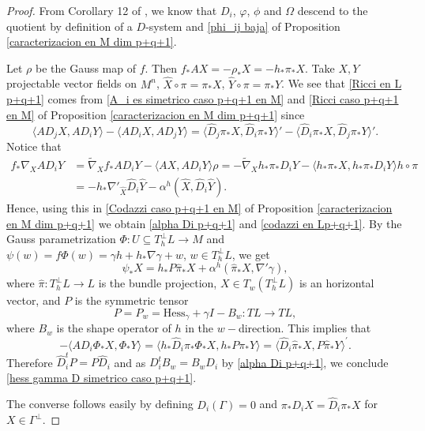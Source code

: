 \documentclass{article}
\theoremstyle{remark}
\begin{document}
\begin{proof}
    From Corollary 12 of \cite{DFT}, we know that $D_i$, $\varphi$, $\phi$ and $\Omega$ descend to the quotient by definition of a $D$-system and \ref{phi_ij baja} of Proposition \ref{caracterizacion en M dim p+q+1}. 
    
    Let $\rho$ be the Gauss map of $f$. Then $f_{*}AX=-\rho_{*}X=-h_{*}\pi_{*}X$. Take $X,Y$ projectable vector fields on $M^n$, $\hat{X}\circ\pi=\pi_{*}X$, $\hat{Y}\circ\pi=\pi_{*}Y$. We see that \ref{Ricci en L p+q+1} comes from \ref{A_i es simetrico caso p+q+1 en M} and \ref{Ricci caso p+q+1 en M} of Proposition \ref{caracterizacion en M dim p+q+1} since
    $$\langle AD_jX, AD_iY\rangle-\langle AD_iX,AD_jY\rangle=\langle \hat{D}_j\pi_{*}X,\hat{D}_i\pi_{*}Y\rangle'-\langle\hat{D}_i\pi_{*}X,\hat{D}_j\pi_{*}Y\rangle'.$$
    Notice that
    \begin{align*}
        f_{*}\nabla_X AD_iY&=\widetilde{\nabla}_X f_{*}AD_iY -\langle AX,AD_iY\rangle \rho=-\widetilde{\nabla}_X h_{*}\pi_{*}D_i Y-\langle h_{*}\pi_{*}X,h_{*}\pi_{*} D_iY\rangle h\circ\pi\\
        &=-h_{*}\nabla'_{\hat{X}}\hat{D}_i\hat{Y}-\alpha^h(\hat{X},\hat{D}_i\hat{Y}).
    \end{align*}
    Hence, using this in \ref{Codazzi caso p+q+1 en M} of Proposition \ref{caracterizacion en M dim p+q+1} we obtain \ref{alpha Di p+q+1} and \ref{codazzi en Lp+q+1}. By the Gauss parametrization $\Phi:U\subseteq T^\perp_h L\rightarrow M$ and $\psi(w)=f\Phi(w)=\gamma h+h_{*}\nabla\gamma+w$, $w\in T^\perp_h L$, we get
    $$\psi_{*}X=h_{*}P\hat{\pi}_{*}X+\alpha^h(\hat{\pi}_{*}X,\nabla'\gamma),$$
    where $\hat{\pi}:T^\perp_h L\rightarrow L$ is the bundle projection, $X\in T_{w}(T^\perp_h L)$ is an horizontal vector, and $P$ is the symmetric tensor 
    \begin{equation}\label{P_w}
        P=P_w=\text{Hess}_\gamma+\gamma I-B_w:TL\rightarrow TL,
    \end{equation}
    where $B_w$ is the shape operator of $h$ in the $w-$direction. This implies that
    \begin{equation*}
        -\langle AD_i\Phi_{*}X,\Phi_{*}Y\rangle=\langle h_{*}\hat{D}_i\pi_{*}\Phi_{*}X,h_{*}P\pi_{*}Y\rangle=\langle \hat{D}_i\hat{\pi}_{*}X,P\hat{\pi}_{*}Y\rangle^{'}.
    \end{equation*}
    Therefore $\hat{D}_i^tP=P\hat{D}_i$ and as $D_i^t B_w=B_w D_i$ by \ref{alpha Di p+q+1}, we conclude \ref{hess gamma D simetrico caso p+q+1}.
    
    The converse follows easily by defining $D_i(\Gamma)=0$  and $\pi_{*}D_i X=\hat{D}_i \pi_{*}X$ for $X\in\Gamma^\perp$.
\end{proof}
\end{document}
